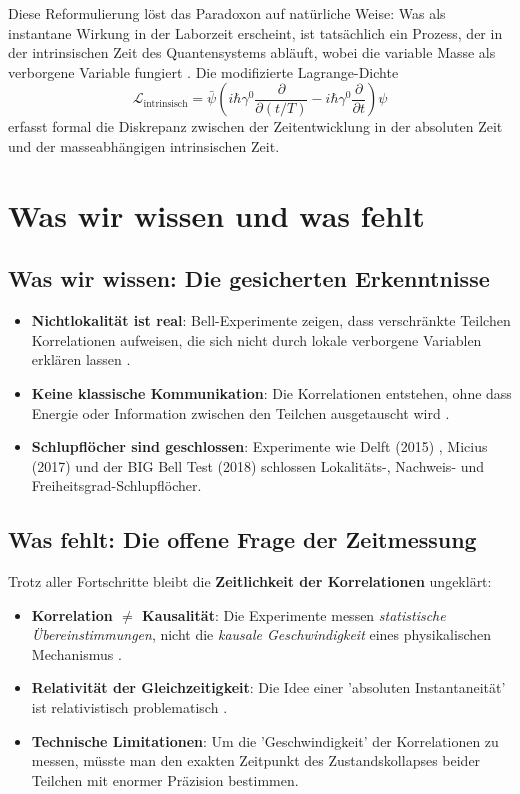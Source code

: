 \documentclass[a4paper,12pt]{article}
\begin{document}
	Diese Reformulierung löst das Paradoxon auf natürliche Weise: Was als instantane Wirkung in der Laborzeit erscheint, ist tatsächlich ein Prozess, der in der intrinsischen Zeit des Quantensystems abläuft, wobei die variable Masse als verborgene Variable fungiert \cite{Pascher2024}. Die modifizierte Lagrange-Dichte
	\begin{equation}
		\mathcal{L}_\text{intrinsisch} = \bar{\psi}\left(i\hbar\gamma^0 \frac{\partial}{\partial (t/T)} - i\hbar\gamma^0 \frac{\partial}{\partial t}\right)\psi
	\end{equation}
	erfasst formal die Diskrepanz zwischen der Zeitentwicklung in der absoluten Zeit und der masseabhängigen intrinsischen Zeit.
	
	\section{Was wir wissen und was fehlt}
	
	\subsection{Was wir wissen: Die gesicherten Erkenntnisse}
	\begin{itemize}
		\item \textbf{Nichtlokalität ist real}: Bell-Experimente zeigen, dass verschränkte Teilchen Korrelationen aufweisen, die sich nicht durch lokale verborgene Variablen erklären lassen \cite{Hensen2015}.
		\item \textbf{Keine klassische Kommunikation}: Die Korrelationen entstehen, ohne dass Energie oder Information zwischen den Teilchen ausgetauscht wird \cite{Giustina2015}.
		\item \textbf{Schlupflöcher sind geschlossen}: Experimente wie Delft (2015) \cite{Hensen2015}, Micius (2017) \cite{Yin2017} und der BIG Bell Test (2018) \cite{BigBellTest2018} schlossen Lokalitäts-, Nachweis- und Freiheitsgrad-Schlupflöcher.
	\end{itemize}
	
	\subsection{Was fehlt: Die offene Frage der Zeitmessung}
	Trotz aller Fortschritte bleibt die \textbf{Zeitlichkeit der Korrelationen} ungeklärt:
	\begin{itemize}
		\item \textbf{Korrelation $\neq$ Kausalität}: Die Experimente messen \textit{statistische Übereinstimmungen}, nicht die \textit{kausale Geschwindigkeit} eines physikalischen Mechanismus \cite{Shimony2017}.
		\item \textbf{Relativität der Gleichzeitigkeit}: Die Idee einer 'absoluten Instantaneität' ist relativistisch problematisch \cite{Maudlin2011}.
		\item \textbf{Technische Limitationen}: Um die 'Geschwindigkeit' der Korrelationen zu messen, müsste man den exakten Zeitpunkt des Zustandskollapses beider Teilchen mit enormer Präzision bestimmen.
	\end{itemize}
	
\end{document}
